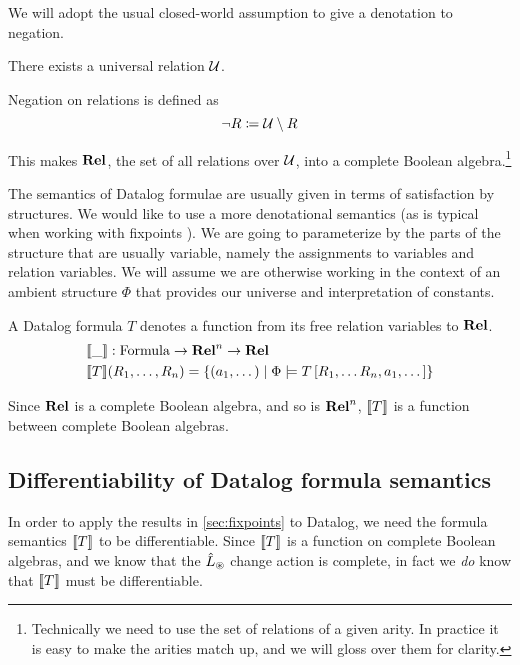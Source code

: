We will adopt the usual closed-world assumption to give a denotation to negation.

\begin{defn}
  There exists a universal relation $\mathcal{U}$.

  Negation on relations is defined as
  \begin{displaymath}
    \neg R \coloneqq \mathcal{U} \setminus R
  \end{displaymath}
\end{defn}

This makes $\mathbf{Rel}$, the set of all relations over $\mathcal{U}$, into a
complete Boolean
algebra.\footnote{Technically we need to use the set of relations of a given
  arity. In practice it is easy to make the arities match up, and we will gloss
  over them for clarity.}

The semantics of Datalog formulae are usually given in terms of satisfaction by
structures. We would like to use a more denotational semantics (as is typical
when working with fixpoints \autocite[see e.g.][]{compton1994stratified}). We are
going to parameterize by the parts of the structure that are usually variable,
namely the assignments to variables and relation variables. We will assume we
are otherwise working in the context of an ambient structure $\Phi$ that
provides our universe and interpretation of constants.

\begin{defn}
  A Datalog formula $T$ denotes a function from its free relation variables to
  $\mathbf{Rel}$.
  \begin{align*}
    &\llbracket \_ \rrbracket : \mathrm{Formula} \rightarrow \mathbf{Rel}^n \rightarrow \mathbf{Rel}\\
    &\llbracket T \rrbracket(R_1, \dots, R_n) = \left\{ \left(a_1, \dots \right) \mid \Phi \models T\left[R_1, \dots R_n, a_1, \dots \right] \right\}
  \end{align*}
\end{defn}

Since $\mathbf{Rel}$ is a complete Boolean algebra, and so is $\mathbf{Rel}^n$, $\llbracket T \rrbracket$ is
a function between complete Boolean algebras.

\subsection{Differentiability of Datalog formula semantics}
\label{sec:datalogDifferentiability}

In order to apply the results in \cref{sec:fixpoints} to Datalog, we need the
formula semantics $\llbracket T \rrbracket$ to
be differentiable. Since $\llbracket T \rrbracket$ is a function on complete Boolean algebras, and we know
that the $\hat{L}_\circledast$ change action is complete, in fact we
\emph{do} know that $\llbracket T \rrbracket$ must be differentiable.

